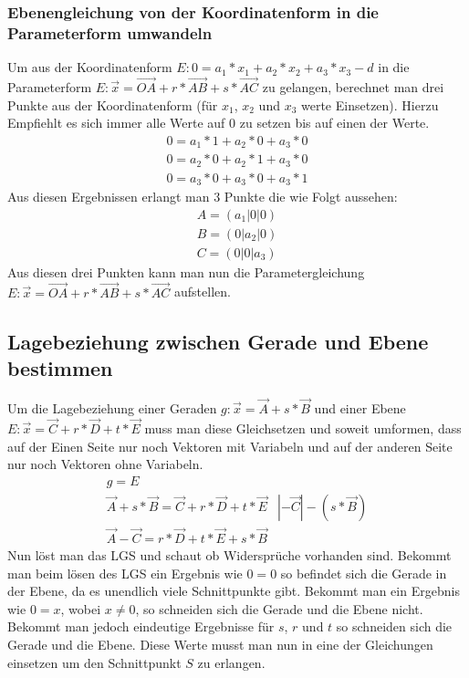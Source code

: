 \documentclass{article}
\begin{document}
\subsubsection{Ebenengleichung von der Koordinatenform in die Parameterform umwandeln}
Um aus der Koordinatenform $E : 0 = a_1 * x_1 + a_2 * x_2 + a_3 * x_3 - d$ in die Parameterform $E : \vec{x} = \vec{OA} + r * \vec{AB} + s * \vec{AC}$ zu gelangen, berechnet man drei Punkte aus der Koordinatenform (für $x_1$, $x_2$ und $x_3$ werte Einsetzen). Hierzu Empfiehlt es sich immer alle Werte auf 0 zu setzen bis auf einen der Werte.
\begin{equation}
\begin{matrix}
0 = a_1 * 1 + a_2 * 0 + a_3 * 0 \\
0 = a_2 * 0 + a_2 * 1 + a_3 * 0 \\
0 = a_3 * 0 + a_3 * 0 + a_3 * 1
\end{matrix}
\end{equation}
Aus diesen Ergebnissen erlangt man 3 Punkte die wie Folgt aussehen:
\begin{equation}
\begin{matrix}
A = (a_1 | 0 | 0) \\
B = (0 | a_2 | 0) \\
C = (0 | 0 | a_3) 
\end{matrix}
\end{equation}
Aus diesen drei Punkten kann man nun die Parametergleichung $E : \vec{x} = \vec{OA} + r * \vec{AB} + s * \vec{AC}$ aufstellen.

\subsection{Lagebeziehung zwischen Gerade und Ebene bestimmen}
Um die Lagebeziehung einer Geraden $g : \vec{x} = \vec{A} + s * \vec{B}$ und einer Ebene $E : \vec{x} = \vec{C} + r * \vec{D} + t * \vec{E}$ muss man diese Gleichsetzen und soweit umformen, dass auf der Einen Seite nur noch Vektoren mit Variabeln und auf der anderen Seite nur noch Vektoren ohne Variabeln.
\begin{equation}
\begin{matrix}
g = E \\
\vec{A} + s * \vec{B} = \vec{C} + r * \vec{D} + t * \vec{E} & | - \vec{C} | - (s* \vec{B}) \\
\vec{A} - \vec{C} = r * \vec{D} + t * \vec{E} + s * \vec{B}
\end{matrix}
\end{equation}
Nun löst man das LGS und schaut ob Widersprüche vorhanden sind. Bekommt man beim lösen des LGS ein Ergebnis wie $0 = 0$ so befindet sich die Gerade in der Ebene, da es unendlich viele Schnittpunkte gibt. Bekommt man ein Ergebnis wie $0 = x$, wobei $x \neq 0$, so schneiden sich die Gerade und die Ebene nicht. Bekommt man jedoch eindeutige Ergebnisse für $s$, $r$ und $t$ so schneiden sich die Gerade und die Ebene. Diese Werte musst man nun in eine der Gleichungen einsetzen um den Schnittpunkt $S$ zu erlangen. 
\end{document}
